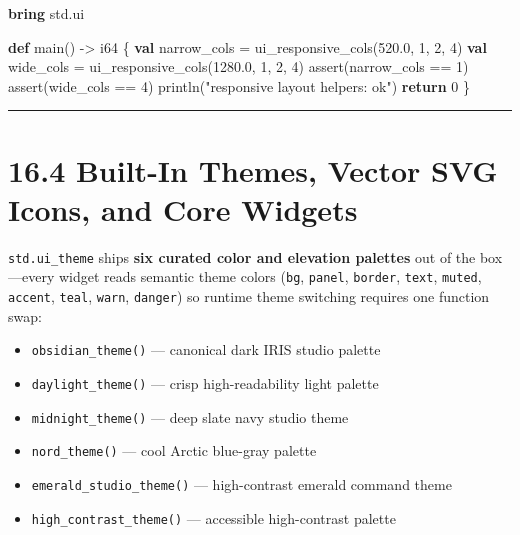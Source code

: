 \documentclass[
  english,
  oneside]{book}
\newenvironment{Shaded}{\begin{snugshade}}{\end{snugshade}}
\newcommand{\ControlFlowTok}[1]{\textcolor[rgb]{0.77,0.53,0.75}{\textbf{#1}}}
\newcommand{\DataTypeTok}[1]{\textcolor[rgb]{0.31,0.79,0.69}{#1}}
\newcommand{\DecValTok}[1]{\textcolor[rgb]{0.71,0.81,0.66}{#1}}
\newcommand{\FloatTok}[1]{\textcolor[rgb]{0.71,0.81,0.66}{#1}}
\newcommand{\FunctionTok}[1]{\textcolor[rgb]{0.86,0.86,0.67}{#1}}
\newcommand{\KeywordTok}[1]{\textcolor[rgb]{0.34,0.61,0.84}{\textbf{#1}}}
\newcommand{\NormalTok}[1]{\textcolor[rgb]{0.83,0.83,0.83}{#1}}
\newcommand{\OperatorTok}[1]{\textcolor[rgb]{0.83,0.83,0.83}{#1}}
\newcommand{\StringTok}[1]{\textcolor[rgb]{0.81,0.57,0.47}{#1}}
\providecommand{\tightlist}{%
  \setlength{\itemsep}{0pt}\setlength{\parskip}{0pt}}
\begin{document}
\begin{Shaded}
\begin{Highlighting}[]
\KeywordTok{bring}\NormalTok{ std}\OperatorTok{.}\NormalTok{ui}

\KeywordTok{def}\NormalTok{ main() }\OperatorTok{{-}\textgreater{}} \DataTypeTok{i64}\NormalTok{ \{}
    \KeywordTok{val}\NormalTok{ narrow\_cols }\OperatorTok{=}\NormalTok{ ui\_responsive\_cols(}\FloatTok{520.0}\NormalTok{, }\DecValTok{1}\NormalTok{, }\DecValTok{2}\NormalTok{, }\DecValTok{4}\NormalTok{)}
    \KeywordTok{val}\NormalTok{ wide\_cols }\OperatorTok{=}\NormalTok{ ui\_responsive\_cols(}\FloatTok{1280.0}\NormalTok{, }\DecValTok{1}\NormalTok{, }\DecValTok{2}\NormalTok{, }\DecValTok{4}\NormalTok{)}
    \FunctionTok{assert}\NormalTok{(narrow\_cols }\OperatorTok{==} \DecValTok{1}\NormalTok{)}
    \FunctionTok{assert}\NormalTok{(wide\_cols }\OperatorTok{==} \DecValTok{4}\NormalTok{)}
\NormalTok{    println(}\StringTok{"responsive layout helpers: ok"}\NormalTok{)}
    \ControlFlowTok{return} \DecValTok{0}
\NormalTok{\}}
\end{Highlighting}
\end{Shaded}

\begin{center}\rule{0.5\linewidth}{0.5pt}\end{center}

\section{16.4 Built-In Themes, Vector SVG Icons, and Core
Widgets}\label{built-in-themes-vector-svg-icons-and-core-widgets}

\texttt{std.ui\_theme} ships \textbf{six curated color and elevation
palettes} out of the box---every widget reads semantic theme colors
(\texttt{bg}, \texttt{panel}, \texttt{border}, \texttt{text},
\texttt{muted}, \texttt{accent}, \texttt{teal}, \texttt{warn},
\texttt{danger}) so runtime theme switching requires one function swap:

\begin{itemize}
\tightlist
\item
  \texttt{obsidian\_theme()} --- canonical dark IRIS studio palette
\item
  \texttt{daylight\_theme()} --- crisp high-readability light palette
\item
  \texttt{midnight\_theme()} --- deep slate navy studio theme
\item
  \texttt{nord\_theme()} --- cool Arctic blue-gray palette
\item
  \texttt{emerald\_studio\_theme()} --- high-contrast emerald command
  theme
\item
  \texttt{high\_contrast\_theme()} --- accessible high-contrast palette
\end{itemize}
\end{document}
